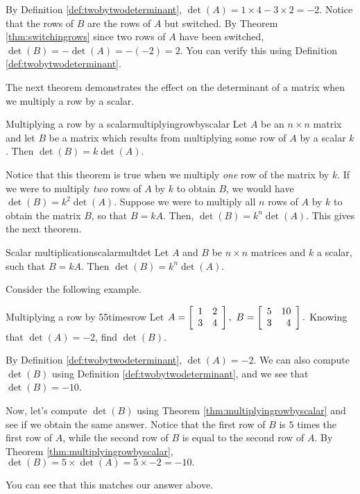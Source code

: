\begin{solution}
By Definition \ref{def:twobytwodeterminant}, 
$\det \left(A\right) = 1 \times 4 - 3 \times 2 = -2$. 
Notice that the rows of $B$ are the rows of $A$ but switched. 
By Theorem \ref{thm:switchingrows} since two rows of $A$ have been switched,
$\det \left(B\right) = - \det \left(A\right) = - \left(-2\right) = 2$.
You can verify this using Definition \ref{def:twobytwodeterminant}. 
\end{solution}

The next theorem demonstrates the effect on the determinant of a matrix when we multiply
a row by a scalar.

\begin{theorem}{Multiplying a row by a scalar}{multiplyingrowbyscalar}
Let $A$ be an $n\times n$ matrix and let $B$ be a matrix
which results from multiplying some row of $A$ by a scalar $k$. Then $\det
\left( B\right) = k \det \left( A\right) $.
\end{theorem}

Notice that this theorem is true when we multiply {\em one\em} row of the matrix by $k$.
If we were to multiply {\em two\em} rows of $A$ by $k$ to obtain $B$, we would have
$\det \left(B\right) = k^2 \det \left(A\right)$.
Suppose we were to multiply all $n$ rows of $A$ by $k$ to obtain the matrix $B$, so that 
$B = kA$. Then, $\det \left(B\right) = k^n \det \left(A\right)$. This gives the next theorem.

\begin{theorem}{Scalar multiplication}{scalarmultdet}
Let $A$ and $B$ be $n \times n$ matrices and $k$ a scalar, such that $B = kA$. Then $\det(B) = k^n \det(A)$.
\end{theorem}

Consider the following example.

\begin{example}{Multiplying a row by 5}{5timesrow}
Let $A=\left[
\begin{array}{rr}
1 & 2 \\
3 & 4
\end{array}
\right] ,\ B=\left[
\begin{array}{rr}
5 & 10 \\
3 & 4
\end{array}
\right] .$ 
Knowing that $\det \left( A \right) =-2$, find  $\det \left( B \right) $.
\end{example}

\begin{solution} 
By Definition \ref{def:twobytwodeterminant}, $\det \left( A\right) =-2.$ We can also compute
$\det \left(B\right)$ using Definition \ref{def:twobytwodeterminant}, and we see that $\det \left(B\right) = -10$. 

Now, let's compute  $\det \left(B\right)$ using Theorem \ref{thm:multiplyingrowbyscalar} and see if we
obtain the same answer. Notice that the first row of $B$ is $5$ times the first row of $A$, while the
second row of $B$ is equal to the second row of $A$. 
By Theorem \ref{thm:multiplyingrowbyscalar}, 
$\det  \left( B \right) = 5 \times \det \left( A \right) = 5 \times -2 = -10.$

You can see that this matches our answer above.
\end{solution}

